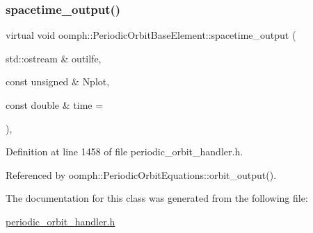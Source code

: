 \subsubsection{\texorpdfstring{spacetime\+\_\+output()}{spacetime\_output()}}
{\footnotesize\ttfamily virtual void oomph\+::\+Periodic\+Orbit\+Base\+Element\+::spacetime\+\_\+output (\begin{DoxyParamCaption}\item[{std\+::ostream \&}]{outilfe,  }\item[{const unsigned \&}]{Nplot,  }\item[{const double \&}]{time = {} }\end{DoxyParamCaption})\hspace{0.3cm}{\ttfamily [inline]}, {\ttfamily [virtual]}}



Definition at line 1458 of file periodic\+\_\+orbit\+\_\+handler.\+h.



Referenced by oomph\+::\+Periodic\+Orbit\+Equations\+::orbit\+\_\+output().



The documentation for this class was generated from the following file\+:\begin{DoxyCompactItemize}
\item 
\hyperlink{periodic__orbit__handler_8h}{periodic\+\_\+orbit\+\_\+handler.\+h}\end{DoxyCompactItemize}
